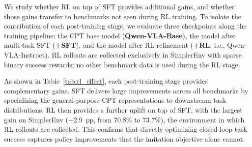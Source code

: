 \documentclass{article}
\begin{document}
We study whether RL on top of SFT provides additional gains, and whether those gains transfer to benchmarks not seen during RL training.
To isolate the contribution of each post-training stage, we evaluate three checkpoints along the training pipeline: the CPT base model (\textbf{Qwen-VLA-Base}), the model after multi-task SFT (\textbf{+SFT}), and the model after RL refinement (\textbf{+RL}, i.e., Qwen-VLA-Instruct).
RL rollouts are collected exclusively in SimplerEnv with sparse binary success rewards; no other benchmark data is used during the RL stage.

\begin{table}[htbp]
  \centering
  \small
  \caption{\textbf{Cumulative effect of post-training stages.} Each row adds one stage on top of the previous checkpoint. RL rollouts are collected only in SimplerEnv. All numbers are success rates (\%) except the DOMINO Manipulation Score (MS).}
  \label{tab:rl_effect}
\end{table}

As shown in Table~\ref{tab:rl_effect}, each post-training stage provides complementary gains.
SFT delivers large improvements across all benchmarks by specializing the general-purpose CPT representations to downstream task distributions.
RL then provides a further uplift on top of SFT, with the largest gain on SimplerEnv (+2.9~pp, from 70.8\% to 73.7\%), the environment in which RL rollouts are collected.
This confirms that directly optimizing closed-loop task success captures policy improvements that the imitation objective alone cannot.
\end{document}
